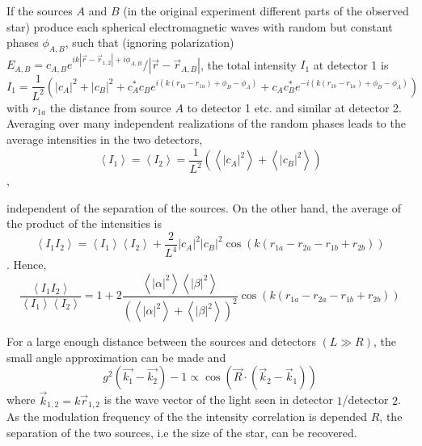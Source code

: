 If the sources $A$ and $B$ (in the original experiment different parts of the observed star) produce each spherical electromagnetic waves with random but constant phases $\phi_{A,B}$, such that (ignoring polarization) $E_{A,B}=c_{A,B} e^{i k\left|\vec{r}-\vec{r}_{1,2}\right|+i \phi_{A,B}} /\left|\vec{r}-\vec{r}_{A,B}\right|$, the total intensity $I_{1}$ at detector 1 is
\begin{equation}
	I_{1} =
	\frac{1}{L^{2}}\left(
	|c_A|^{2}
	+|c_B|^{2}
	+c_A^{*} c_B     e^{ i\left(k\left(r_{1 b}-r_{1 a}\right)+\phi_{B}-\phi_{A}\right)}
	+c_A     c_B^{*} e^{-i\left(k\left(r_{1 b}-r_{1 a}\right)+\phi_{B}-\phi_{A}\right)}
	\right)
\end{equation}
with $r_{1 a}$ the distance from source $A$ to detector 1 etc. and similar at detector 2.
Averaging over many independent realizations of the random phases leads to the average intensities in the two detectors,
\begin{equation}
	\left\langle I_{1}\right\rangle=\left\langle I_{2}\right\rangle=\frac{1}{L^{2}}\left(\left\langle|c_A|^{2}\right\rangle+\left\langle|c_B|^{2}\right\rangle\right)
\end{equation}, 

independent of the separation of the sources. On the other hand, the average of the product of the intensities is
\begin{equation}
	\left\langle I_{1} I_{2}\right\rangle =
	\left\langle I_{1}\right\rangle\left\langle I_{2}\right\rangle+\frac{2}{L^{4}}|c_A|^{2}|c_B|^{2} \cos \left(k\left(r_{1 a}-r_{2 a}-r_{1 b}+r_{2 b}\right)\right) 
\end{equation}.
Hence,
\begin{equation}
	\frac{\left\langle I_{1} I_{2}\right\rangle}{\left\langle I_{1}\right\rangle\left\langle I_{2}\right\rangle}
	=1+2 \frac{\left\langle|\alpha|^{2}\right\rangle\left\langle|\beta|^{2}\right\rangle}{\left(\left\langle|\alpha|^{2}\right\rangle+\left\langle|\beta|^{2}\right\rangle\right)^{2}} \cos \left(k\left(r_{1 a}-r_{2 a}-r_{1 b}+r_{2 b}\right)\right)
\end{equation}

For a large enough distance between the sources and detectors $(L \gg R)$, the small angle approximation can be made and
\begin{equation}
	g^2\left(\vec{k_1}-\vec{k_2}\right)-1\propto \cos{\left(\vec{R} \cdot\left(\vec{k}_{2}-\vec{k}_{1}\right)\right)}
\end{equation} 
where $\vec{k}_{1,2}=k \vec{r}_{1,2}$ is the wave vector of the light seen in detector $1$/detector $2$. As the modulation frequency of the the intensity correlation is depended $R$, the separation of the two sources, i.e the size of the star, can be recovered.

